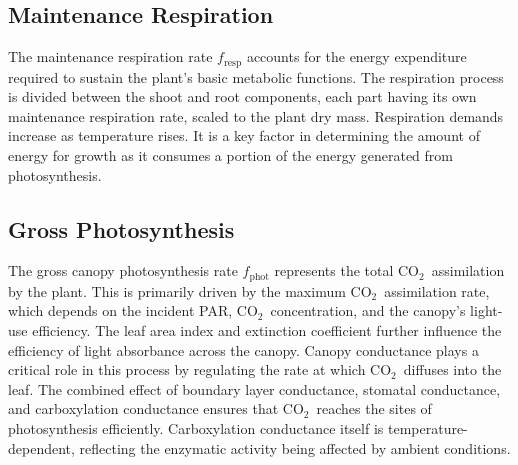 \documentclass[conference]{IEEEtran}
\newcommand{\ui}[2]{#1_{\mathrm{#2}}}
\newcommand{\coo}{\ensuremath{\mathrm{CO_2}}}
\begin{document}
\subsection{Maintenance Respiration} The maintenance respiration rate \( \ui{f}{resp} \) accounts for the energy expenditure required to sustain the plant's basic metabolic functions. The respiration process is divided between the shoot and root components, each part having its own maintenance respiration rate, scaled to the plant dry mass. Respiration demands increase as temperature rises. It is a key factor in determining the amount of energy for growth as it consumes a portion of the energy generated from photosynthesis.

\subsection{Gross Photosynthesis} The gross canopy photosynthesis rate \( \ui{f}{phot} \) represents the total \coo\ assimilation by the plant. This is primarily driven by the maximum \coo\ assimilation rate, which depends on the incident PAR, \coo\ concentration, and the canopy's light-use efficiency. The leaf area index and extinction coefficient further influence the efficiency of light absorbance across the canopy. Canopy conductance plays a critical role in this process by regulating the rate at which \coo\ diffuses into the leaf. The combined effect of boundary layer conductance, stomatal conductance, and carboxylation conductance ensures that \coo\ reaches the sites of photosynthesis efficiently. Carboxylation conductance itself is temperature-dependent, reflecting the enzymatic activity being affected by ambient conditions.





\end{document}
